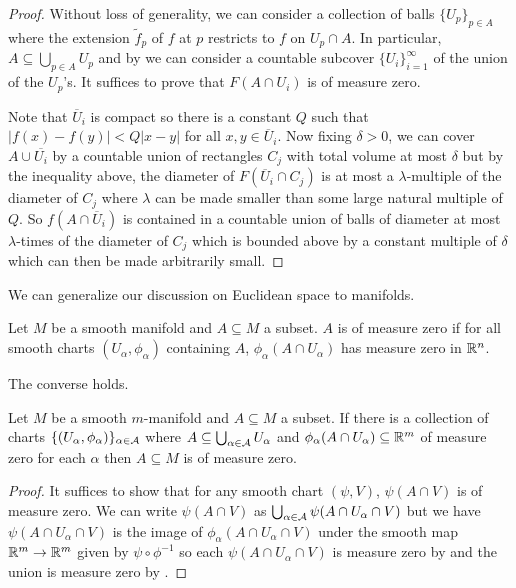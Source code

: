 \begin{proof}
    Without loss of generality, we can consider a collection of balls $\{U_{p}\}_{p\in A}$ where the extension $\widetilde{f}_{p}$ of $f$ at $p$ restricts to $f$ on $U_{p}\cap A$. In particular, $A\subseteq\bigcup_{p\in A}U_{p}$ and by  we can consider a countable subcover $\{U_{i}\}_{i=1}^{\infty}$ of the union of the $U_{p}$'s. It suffices to prove that $F(A\cap U_{i})$ is of measure zero. 

    Note that $\overline{U}_{i}$ is compact so there is a constant $Q$ such that $|f(x)-f(y)|<Q|x-y|$ for all $x,y\in\overline{U}_{i}$. Now fixing $\delta>0$, we can cover $A\cup\overline{U_{i}}$ by a countable union of rectangles $C_{j}$ with total volume at most $\delta$ but by the inequality above, the diameter of $F(\overline{U}_{i}\cap C_{j})$ is at most a $\lambda$-multiple of the diameter of $C_{j}$ where $\lambda$ can be made smaller than some large natural multiple of $Q$. So $f(A\cap\overline{U}_{i})$ is contained in a countable union of balls of diameter at most $\lambda$-times of the diameter of $C_{j}$ which is bounded above by a constant multiple of $\delta$ which can then be made arbitrarily small. 
\end{proof}
We can generalize our discussion on Euclidean space to manifolds. 
\begin{definition}\label{def: measure zero subset of manifold}
    Let $M$ be a smooth manifold and $A\subseteq M$ a subset. $A$ is of measure zero if for all smooth charts $(U_{\alpha},\phi_{\alpha})$ containing $A$, $\phi_{\alpha}(A\cap U_{\alpha})$ has measure zero in $\mathbb{R}^{n}$. 
\end{definition}
The converse holds. 
\begin{proposition}\label{prop: measure zero on each chart implies measure zero}
    Let $M$ be a smooth $m$-manifold and $A\subseteq M$ a subset. If there is a collection of charts $\{(U_{\alpha},\phi_{\alpha})\}_{\alpha\in\mathcal{A}}$ where $A\subseteq\bigcup_{\alpha\in\mathcal{A}}U_{\alpha}$ and $\phi_{\alpha}(A\cap U_{\alpha})\subseteq\mathbb{R}^{m}$ of measure zero for each $\alpha$ then $A\subseteq M$ is of measure zero. 
\end{proposition}
\begin{proof}
    It suffices to show that for any smooth chart $(\psi,V)$, $\psi(A\cap V)$ is of measure zero. We can write $\psi(A\cap V)$ as $\bigcup_{\alpha\in\mathcal{A}}\psi(A\cap U_{\alpha}\cap V)$ but we have $\psi(A\cap U_{\alpha}\cap V)$ is the image of $\phi_{\alpha}(A\cap U_{\alpha}\cap V)$ under the smooth map $\mathbb{R}^{m}\to\mathbb{R}^{m}$ given by $\psi\circ\phi^{-1}$ so each $\psi(A\cap U_{\alpha}\cap V)$ is measure zero by  and the union is measure zero by . 
\end{proof}
